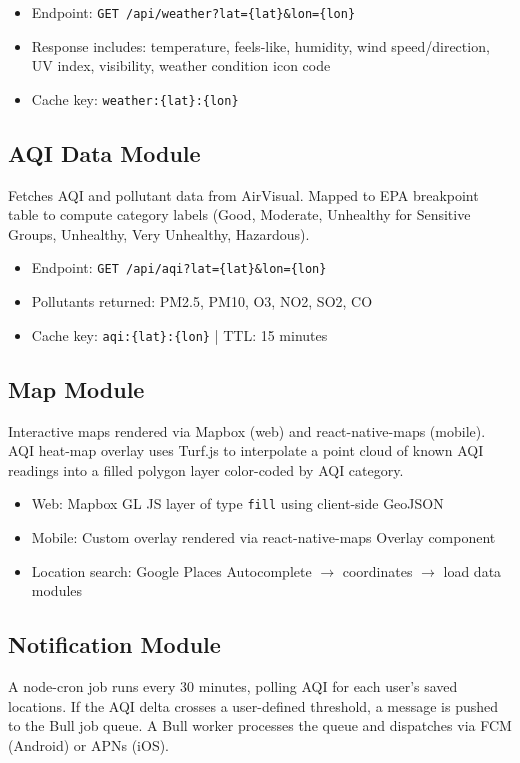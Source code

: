 \documentclass[12pt]{article}
\begin{document}
\begin{itemize}
    \item Endpoint: \texttt{GET /api/weather?lat=\{lat\}\&lon=\{lon\}}
    \item Response includes: temperature, feels-like, humidity, wind speed/direction, UV index, visibility, weather condition icon code
    \item Cache key: \texttt{weather:\{lat\}:\{lon\}}
\end{itemize}

\subsection{AQI Data Module}
Fetches AQI and pollutant data from AirVisual. Mapped to EPA breakpoint table to compute category labels (Good, Moderate, Unhealthy for Sensitive Groups, Unhealthy, Very Unhealthy, Hazardous).

\begin{itemize}
    \item Endpoint: \texttt{GET /api/aqi?lat=\{lat\}\&lon=\{lon\}}
    \item Pollutants returned: PM2.5, PM10, O3, NO2, SO2, CO
    \item Cache key: \texttt{aqi:\{lat\}:\{lon\}} | TTL: 15 minutes
\end{itemize}

\subsection{Map Module}
Interactive maps rendered via Mapbox (web) and react-native-maps (mobile). AQI heat-map overlay uses Turf.js to interpolate a point cloud of known AQI readings into a filled polygon layer color-coded by AQI category.

\begin{itemize}
    \item Web: Mapbox GL JS layer of type \texttt{fill} using client-side GeoJSON
    \item Mobile: Custom overlay rendered via react-native-maps Overlay component
    \item Location search: Google Places Autocomplete $\rightarrow$ coordinates $\rightarrow$ load data modules
\end{itemize}

\subsection{Notification Module}
A node-cron job runs every 30 minutes, polling AQI for each user's saved locations. If the AQI delta crosses a user-defined threshold, a message is pushed to the Bull job queue. A Bull worker processes the queue and dispatches via FCM (Android) or APNs (iOS).
\end{document}
